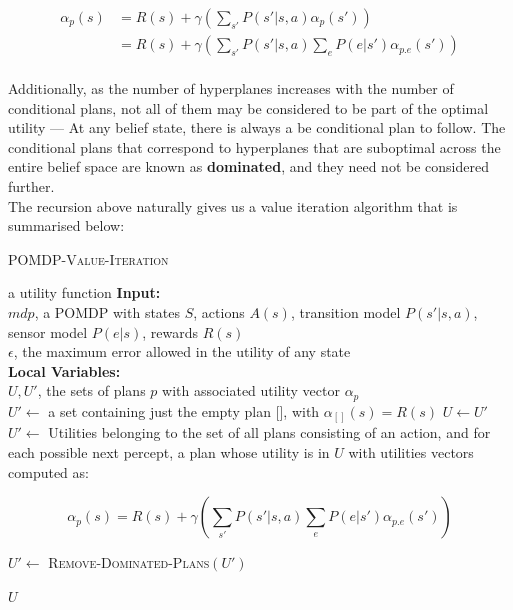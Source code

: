 \documentclass[11pt]{article}
\begin{document}
$$
\begin{aligned}
\alpha_p(s) &= R(s) + \gamma \left( \sum_{s'} P(s' | s, a) \alpha_p(s') \right)\\
&= R(s) + \gamma \left( \sum_{s'} P(s' | s, a) \sum_e P(e|s') \alpha_{p.e}(s') \right)\\
\end{aligned}
$$

Additionally, as the number of hyperplanes increases with the number of conditional plans, not all of them may be considered to be part of the optimal utility --- At any belief state, there is always a be conditional plan to follow. The conditional plans that correspond to hyperplanes that are suboptimal across the entire belief space are known as \textbf{dominated}, and they need not be considered further.\\

The recursion above naturally gives us a value iteration algorithm that is summarised below:

\begin{algorithm}[!htb]
\caption{\textsc{POMDP-Value-Iteration}}
\begin{algorithmic}[1]
 \Return a utility function
\State \textbf{Input:} \\
\hspace*{\algorithmicindent} \hspace*{\algorithmicindent} $mdp$, a POMDP with states $S$, actions $A(s)$, transition model $P(s' | s, a)$, sensor model $P(e|s)$, rewards $R(s)$\\ 
\hspace*{\algorithmicindent} \hspace*{\algorithmicindent} $\epsilon$, the maximum error allowed in the utility of any state\\

\State \textbf{Local Variables:} \\
\hspace*{\algorithmicindent} \hspace*{\algorithmicindent} $U, U'$, the sets of plans $p$ with associated utility vector $\alpha_p$\\

\State $U' \leftarrow$ a set containing just the empty plan [], with $\alpha_{[]}(s) = R(s)$
\Repeat
\State $U \leftarrow U'$
\State $U' \leftarrow$ Utilities belonging to the set of all plans consisting of an action, and for each possible next percept, a plan whose utility is in $U$ with utilities vectors computed as:

$$
\alpha_p(s) = R(s) + \gamma \left( \sum_{s'} P(s' | s, a) \sum_e P(e|s') \alpha_{p.e}(s') \right)
$$

\State $U' \leftarrow$ \textsc{Remove-Dominated-Plans}$(U')$

\State \Return $U$
\EndProcedure
\end{algorithmic}
\end{algorithm}
\end{document}

